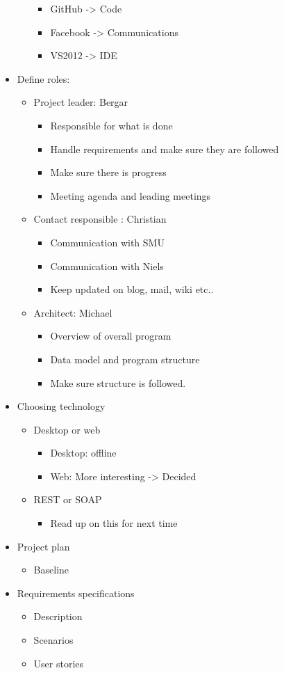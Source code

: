 \documentclass[11pt]{article}
\begin{document}
\begin{landscape}
\begin{multicols}{2}
\begin{itemize}
\begin{itemize}
\begin{itemize}
\item GitHub -> Code
\item Facebook -> Communications
\item VS2012 -> IDE
\end{itemize}
\end{itemize}
\item Define roles:
\begin{itemize}
\item Project leader: Bergar
\begin{itemize}
\item Responsible for what is done
\item Handle requirements and make sure they are followed
\item Make sure there is progress
\item Meeting agenda and leading meetings
\end{itemize}
\item Contact responsible : Christian
\begin{itemize}
\item Communication with SMU
\item Communication with Niels
\item Keep updated on blog, mail, wiki etc..
\end{itemize}
\item Architect: Michael
\begin{itemize}
\item Overview of overall program
\item Data model and program structure
\item Make sure structure is followed.
\end{itemize}
\end{itemize}
\item Choosing technology
\begin{itemize}
\item Desktop or web 
\begin{itemize}
\item Desktop: offline
\item Web: More interesting -> Decided
\end{itemize}
\item REST or SOAP
\begin{itemize}
\item Read up on this for next time
\end{itemize}
\end{itemize}
\item Project plan
\begin{itemize}
\item Baseline
\end{itemize}
\item Requirements specifications
\begin{itemize}
\item Description
\item Scenarios
\item User stories
\end{itemize}
\end{itemize}


\end{multicols}
\end{landscape}
\end{document}
